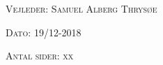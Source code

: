 \begin{center}
\begin{center}
\begin{tabular}{l c r}
			
		\end{tabular}
	\end{center}
	\vspace{0.5 in}
	
	\textsc{\large Vejleder: Samuel Alberg Thrysøe}
	\vspace{0.5 in}
	
	\textsc{\large Dato: 19/12-2018}\\
	\vspace{0.5 in}
	

\textsc{Antal sider: xx} \\
\vfill %
	
\end{center} %

\clearpage

\newpage